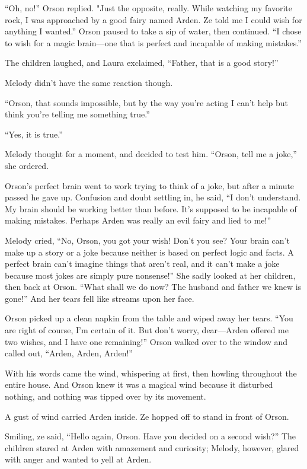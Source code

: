 “Oh, no!” Orson replied. "Just the opposite, really. While watching my favorite rock, I was approached by a good fairy named Arden. Ze told me I could wish for anything I wanted.” Orson paused to take a sip of water, then continued. “I chose to wish for a magic brain—one that is perfect and incapable of making mistakes.”

The children laughed, and Laura exclaimed, “Father, that is a good story!”

Melody didn't have the same reaction though.

“Orson, that sounds impossible, but by the way you're acting I can't help but think you're telling me something true.”

“Yes, it is true.”

Melody thought for a moment, and decided to test him. “Orson, tell me a joke,” she ordered.

Orson's perfect brain went to work trying to think of a joke, but after a minute passed he gave up. Confusion and doubt settling in, he said, “I don't understand. My brain should be working better than before. It's supposed to be incapable of making mistakes. Perhaps Arden was really an evil fairy and lied to me!”

Melody cried, “No, Orson, you got your wish! Don't you see? Your brain can't make up a story or a joke because neither is based on perfect logic and facts. A perfect brain can't imagine things that aren't real, and it can't make a joke because most jokes are simply pure nonsense!” She sadly looked at her children, then back at Orson. “What shall we do now? The husband and father we knew is gone!” And her tears fell like streams upon her face.

Orson picked up a clean napkin from the table and wiped away her tears. “You are right of course, I'm certain of it. But don't worry, dear—Arden offered me two wishes, and I have one remaining!” Orson walked over to the window and called out, “Arden, Arden, Arden!”

With his words came the wind, whispering at first, then howling throughout the entire house. And Orson knew it was a magical wind because it disturbed nothing, and nothing was tipped over by its movement.

A gust of wind carried Arden inside. Ze hopped off to stand in front of Orson.

Smiling, ze said, “Hello again, Orson. Have you decided on a second wish?” The children stared at Arden with amazement and curiosity; Melody, however, glared with anger and wanted to yell at Arden.

